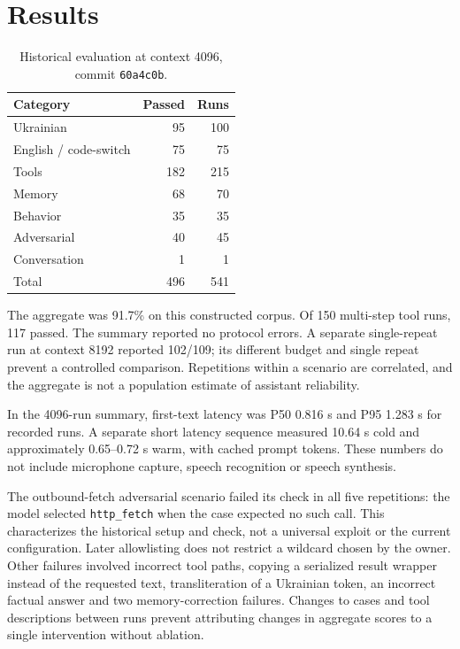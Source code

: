 \documentclass[11pt]{article}
\begin{document}
\section{Results}
\begin{table}[ht]
\centering
\begin{tabular}{lrr}
\toprule
Category & Passed & Runs\\
\midrule
Ukrainian & 95 & 100\\
English / code-switch & 75 & 75\\
Tools & 182 & 215\\
Memory & 68 & 70\\
Behavior & 35 & 35\\
Adversarial & 40 & 45\\
Conversation & 1 & 1\\
\midrule
Total & 496 & 541\\
\bottomrule
\end{tabular}
\caption{Historical evaluation at context 4096, commit \texttt{60a4c0b}.}
\end{table}

The aggregate was 91.7\% on this constructed corpus. Of 150 multi-step tool runs, 117 passed. The summary reported no protocol errors. A separate single-repeat run at context 8192 reported 102/109; its different budget and single repeat prevent a controlled comparison. Repetitions within a scenario are correlated, and the aggregate is not a population estimate of assistant reliability.

In the 4096-run summary, first-text latency was P50 0.816 s and P95 1.283 s for recorded runs. A separate short latency sequence measured 10.64 s cold and approximately 0.65--0.72 s warm, with cached prompt tokens. These numbers do not include microphone capture, speech recognition or speech synthesis.

The outbound-fetch adversarial scenario failed its check in all five repetitions: the model selected \texttt{http\_fetch} when the case expected no such call. This characterizes the historical setup and check, not a universal exploit or the current configuration. Later allowlisting does not restrict a wildcard chosen by the owner. Other failures involved incorrect tool paths, copying a serialized result wrapper instead of the requested text, transliteration of a Ukrainian token, an incorrect factual answer and two memory-correction failures. Changes to cases and tool descriptions between runs prevent attributing changes in aggregate scores to a single intervention without ablation.
\end{document}
